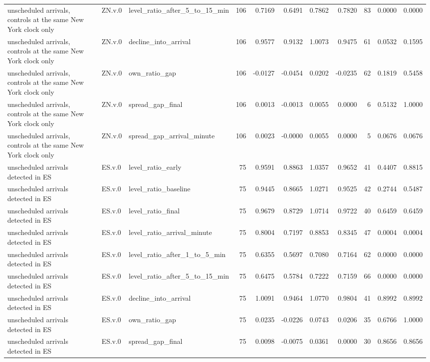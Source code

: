 \begin{tabular}{lllrrrrrrrr}
unscheduled arrivals, controls at the same New York clock only & ZN.v.0 & level_ratio_after_5_to_15_min & 106 & 0.7169 & 0.6491 & 0.7862 & 0.7820 & 83 & 0.0000 & 0.0000 \\
unscheduled arrivals, controls at the same New York clock only & ZN.v.0 & decline_into_arrival & 106 & 0.9577 & 0.9132 & 1.0073 & 0.9475 & 61 & 0.0532 & 0.1595 \\
unscheduled arrivals, controls at the same New York clock only & ZN.v.0 & own_ratio_gap & 106 & -0.0127 & -0.0454 & 0.0202 & -0.0235 & 62 & 0.1819 & 0.5458 \\
unscheduled arrivals, controls at the same New York clock only & ZN.v.0 & spread_gap_final & 106 & 0.0013 & -0.0013 & 0.0055 & 0.0000 & 6 & 0.5132 & 1.0000 \\
unscheduled arrivals, controls at the same New York clock only & ZN.v.0 & spread_gap_arrival_minute & 106 & 0.0023 & -0.0000 & 0.0055 & 0.0000 & 5 & 0.0676 & 0.0676 \\
unscheduled arrivals detected in ES & ES.v.0 & level_ratio_early & 75 & 0.9591 & 0.8863 & 1.0357 & 0.9652 & 41 & 0.4407 & 0.8815 \\
unscheduled arrivals detected in ES & ES.v.0 & level_ratio_baseline & 75 & 0.9445 & 0.8665 & 1.0271 & 0.9525 & 42 & 0.2744 & 0.5487 \\
unscheduled arrivals detected in ES & ES.v.0 & level_ratio_final & 75 & 0.9679 & 0.8729 & 1.0714 & 0.9722 & 40 & 0.6459 & 0.6459 \\
unscheduled arrivals detected in ES & ES.v.0 & level_ratio_arrival_minute & 75 & 0.8004 & 0.7197 & 0.8853 & 0.8345 & 47 & 0.0004 & 0.0004 \\
unscheduled arrivals detected in ES & ES.v.0 & level_ratio_after_1_to_5_min & 75 & 0.6355 & 0.5697 & 0.7080 & 0.7164 & 62 & 0.0000 & 0.0000 \\
unscheduled arrivals detected in ES & ES.v.0 & level_ratio_after_5_to_15_min & 75 & 0.6475 & 0.5784 & 0.7222 & 0.7159 & 66 & 0.0000 & 0.0000 \\
unscheduled arrivals detected in ES & ES.v.0 & decline_into_arrival & 75 & 1.0091 & 0.9464 & 1.0770 & 0.9804 & 41 & 0.8992 & 0.8992 \\
unscheduled arrivals detected in ES & ES.v.0 & own_ratio_gap & 75 & 0.0235 & -0.0226 & 0.0743 & 0.0206 & 35 & 0.6766 & 1.0000 \\
unscheduled arrivals detected in ES & ES.v.0 & spread_gap_final & 75 & 0.0098 & -0.0075 & 0.0361 & 0.0000 & 30 & 0.8656 & 0.8656 \\

\end{tabular}

